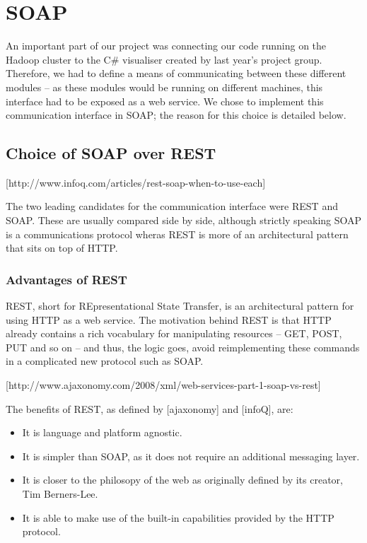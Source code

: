 \section{SOAP}

An important part of our project was connecting our code running on the Hadoop cluster to the C\# visualiser created by last year's project group. Therefore, we had to define a means of communicating between these different modules -- as these modules would be running on different machines, this interface had to be exposed as a web service. We chose to implement this communication interface in SOAP; the reason for this choice is detailed below.

\subsection{Choice of SOAP over REST}

[http://www.infoq.com/articles/rest-soap-when-to-use-each]

The two leading candidates for the communication interface were REST and SOAP. These are usually compared side by side, although strictly speaking SOAP is a communications protocol wheras REST is more of an architectural pattern that sits on top of HTTP.

\subsubsection{Advantages of REST}

REST, short for REpresentational State Transfer, is an architectural pattern for using HTTP as a web service. The motivation behind REST is that HTTP already contains a rich vocabulary for manipulating resources -- GET, POST, PUT and so on -- and thus, the logic goes, avoid reimplementing these commands in a complicated new protocol such as SOAP.

[http://www.ajaxonomy.com/2008/xml/web-services-part-1-soap-vs-rest]

The benefits of REST, as defined by [ajaxonomy] and [infoQ], are:
\begin{itemize}
\item It is language and platform agnostic.
\item It is simpler than SOAP, as it does not require an additional messaging
layer.
\item It is closer to the philosopy of the web as originally defined by its
creator, Tim Berners-Lee.
\item It is able to make use of the built-in capabilities provided by the HTTP
protocol.
\end{itemize}

